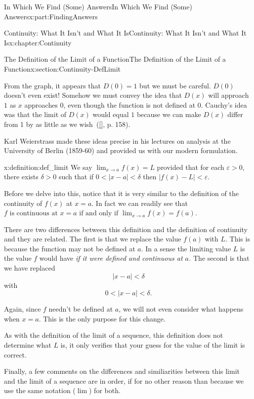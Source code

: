 \documentclass[oneside,10pt,]{book}
\newcommand{\xreffont}{\relax}
\numberwithin{equation}{section}
\newcommand{\abs}[1]{\left|#1\right|}
\def\limit#1#2#3{{\displaystyle\lim_{#1\rightarrow #2}#3}}
\newcommand{\eps}{\varepsilon}
\newcommand{\lt}{<}
\begin{document}
\begin{partptx}{In Which We Find (Some) Answers}{}{In Which We Find (Some) Answers}{}{}{x:part:FindingAnswers}
\begin{chapterptx}{Continuity: What It Isn't and What It Is}{}{Continuity: What It Isn't and What It Is}{}{}{x:chapter:Continuity}
\begin{sectionptx}{The Definition of the Limit of a Function}{}{The Definition of the Limit of a Function}{}{}{x:section:Continuity-DefLimit}
\begin{image}{0.22}{0.56}{0.22}
\end{image}%
From the graph, it appears that \(D(0) =1\) but we must be careful.  \(D(0)\) doesn't even exist!  Somehow we must convey the idea that \(D(x)\) will approach \(1\) as \(x\) approaches \(0\), even though the function is not defined at \(0\).  Cauchy's idea was that the limit of \(D(x)\) would equal \(1\) because we can make \(D(x)\) differ from 1 by as little as we wish~(\hyperlink{x:biblio:jahnke03__histor_analy}{[{\xreffont 6}]}, p. 158).%
\par
Karl Weierstrass  made these ideas precise in his lectures on analysis at the University of Berlin (1859-60) and provided us with our modern formulation.%
\begin{definition}{}{x:definition:def_limit}%
 We say \(\limit{x}{a}{f(x)} =L\) provided that for each \(\eps>0\), there exists \(\delta>0\) such that if \(0\lt \abs{x-a}\lt \delta\) then \(\abs{f(x)-L}\lt \eps\).%
\end{definition}
Before we delve into this, notice that it is very similar to the definition of the continuity of \(f(x)\) at \(x=a\). In fact we can readily see that \(f \text{ is continuous at } x=a \text{ if and only if } \limit{x}{a}{f(x)} = f(a)\).%
\par
There are two differences between this definition and the definition of continuity and they are related.  The first is that we replace the value \(f(a)\) with \(L\).  This is because the function may not be defined at \(a\).  In a sense the limiting value \(L\) is the value \(f\) would have \emph{if it were defined and continuous at \(a\).} The second is that we have replaced%
\begin{equation*}
\abs{x-a}\lt \delta
\end{equation*}
with%
\begin{equation*}
0\lt \abs{x-a}\lt \delta\text{.}
\end{equation*}
%
\par
Again, since \(f\) needn't be defined at \(a\), we will not even consider what happens when \(x=a\). This is the only purpose for this change.%
\par
As with the definition of the limit of a sequence, this definition does not determine what \(L\) is, it only verifies that your guess for the value of the limit is correct.%
\par
Finally, a few comments on the differences and similiarities between this limit and the limit of a sequence are in order, if for no other reason than because we use the same notation (\(\lim\)) for both.%

\end{sectionptx}
\end{chapterptx}
\end{partptx}
\end{document}
